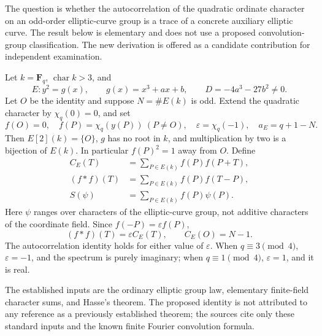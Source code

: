 \documentclass[11pt,a4paper]{article}
\numberwithin{equation}{section}
\newcommand{\F}{\mathbf F}
\begin{document}
The question is whether the autocorrelation of the quadratic ordinate character on an odd-order elliptic-curve group is a trace of a concrete auxiliary elliptic curve. The result below is elementary and does not use a proposed convolution-group classification. The new derivation is offered as a candidate contribution for independent examination.

Let $k=\F_q$, $\operatorname{char}k>3$, and
\begin{equation}\label{eq:curve}
 E:y^2=g(x),\qquad g(x)=x^3+ax+b,\qquad
 D=-4a^3-27b^2\ne0.
\end{equation}
Let $O$ be the identity and suppose $N=\#E(k)$ is odd. Extend the quadratic character by $\chi_q(0)=0$, and set
\begin{equation}\label{eq:definitions}
 f(O)=0,\quad f(P)=\chi_q(y(P))\ (P\ne O),\quad
 \varepsilon=\chi_q(-1),\quad a_E=q+1-N.
\end{equation}
Then $E[2](k)=\{O\}$, $g$ has no root in $k$, and multiplication by two is a bijection of $E(k)$. In particular $f(P)^2=1$ away from $O$. Define
\begin{align}
 C_E(T)&=\sum_{P\in E(k)} f(P)f(P+T),\\
 (f*f)(T)&=\sum_{P\in E(k)} f(P)f(T-P),\\
 S(\psi)&=\sum_{P\in E(k)}f(P)\psi(P).
\end{align}
Here $\psi$ ranges over characters of the elliptic-curve group, not additive characters of the coordinate field. Since $f(-P)=\varepsilon f(P)$,
\begin{equation}\label{eq:convcor}
 (f*f)(T)=\varepsilon C_E(T),\qquad C_E(O)=N-1.
\end{equation}
The autocorrelation identity holds for either value of $\varepsilon$. When $q\equiv3\pmod4$, $\varepsilon=-1$, and the spectrum is purely imaginary; when $q\equiv1\pmod4$, $\varepsilon=1$, and it is real.

The established inputs are the ordinary elliptic group law, elementary finite-field character sums, and Hasse's theorem. The proposed identity is not attributed to any reference as a previously established theorem; the sources cite only these standard inputs and the known finite Fourier convolution formula.
\end{document}
